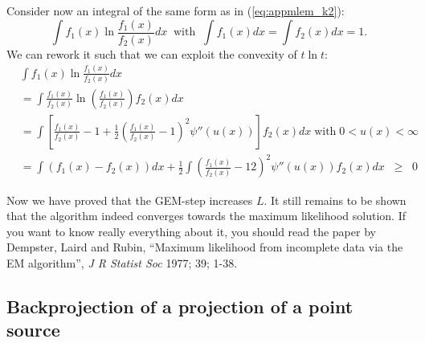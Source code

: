 \documentclass[11pt,oneside]{article}
\begin{document}
Consider now an integral of the same form as in (\ref{eq:appmlem_k2}):
\begin{equation}
  \int f_1(x) \ln \frac{f_1(x)}{f_2(x)} dx \;\; \mbox{with} \;\;
  \int f_1(x) dx = \int f_2(x) dx = 1.
\end{equation}
We can rework it such that we can exploit the convexity of $t \ln t$:
\begin{align}
  &  \int f_1(x) \ln \frac{f_1(x)}{f_2(x)} dx \nonumber\\
  &= \int \frac{f_1(x)}{f_2(x)} \ln \left( \frac{f_1(x)}{f_2(x)} \right)
        f_2(x) dx \nonumber\\
  &= \int \left[ \frac{f_1(x)}{f_2(x)} -1 + 
       \frac{1}{2}\left( \frac{f_1(x)}{f_2(x)} - 1\right)^2 
        \psi''(u(x)) \right]  f_2(x) dx \; \mbox{with} \; 0 < u(x) < \infty 
        \nonumber\\
  &= \int \left( f_1(x) - f_2(x) \right) dx + 
        \frac{1}{2} \int \left( \frac{f_1(x)}{f_2(x)} - 1 2\right)^2
        \psi''(u(x)) f_2(x) dx \;\; \geq \;\; 0
\end{align}

Now we have proved that the GEM-step increases $L$. It still remains
to be shown that the algorithm indeed converges towards the maximum
likelihood solution. If you want to know really everything about it, you
should read the paper by Dempster, Laird and Rubin, ``Maximum
likelihood from incomplete data via the EM algorithm'', {\em J R
Statist Soc} 1977; 39; 1-38.


\newpage
\subsection{Backprojection of a projection of a point source} \label{app:bprojproj}
\end{document}
